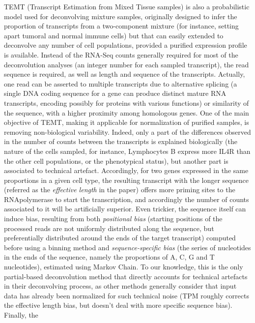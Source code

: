 TEMT (Transcript Estimation from Mixed Tissue samples)
\autocite{li_xie13} is also a
probabilistic model used for deconvolving mixture samples, originally
designed to infer the proportion of transcripts from a two-component
mixture (for instance, setting apart tumoral and normal immune cells)
but that can easily extended to deconvolve any number of cell
populations, provided a purified expression profile is available.
Instead of the \acrshort{RNA-Seq} counts generally required for most of the
deconvolution analyses (an integer number for each sampled transcript),
the read sequence is required, as well as length and sequence of the
transcripts. Actually, one read can be asserted to multiple transcripts
due to alternative splicing (a single DNA coding sequence for a gene can
produce distinct mature RNA transcripts, encoding possibly for proteins
with various functions) or similarity of the sequence, with a higher
proximity among homologous genes. One of the main objective of TEMT,
making it applicable for normalization of purified samples, is removing
non-biological variability. Indeed, only a part of the differences
observed in the number of counts between the transcripts is explained
biologically (the nature of the cells sampled, for instance, Lymphocytes
B express more IL4R than the other cell populations, or the phenotypical
status), but another part is associated to technical artefact.
Accordingly, for two genes expressed in the same proportions in a given
cell type, the resulting transcript with the longer sequence (referred
as the \emph{effective length} in the paper) offers more priming sites
to the RNApolymerase to start the transcription, and accordingly the
number of counts associated to it will be artificially superior. Even
trickier, the sequence itself can induce bias, resulting from both
\emph{positional bias} (starting positions of the processed reads are
not uniformly distributed along the sequence, but preferentially
distributed around the ends of the target transcript) computed before
using a binning method and \emph{sequence-specific bias} (the series of
nucleotides in the ends of the sequence, namely the proportions of A, C,
G and T nucleotides), estimated using Markov Chain. To our knowledge,
this is the only partial-based deconvolution method that directly
accounts for technical artefacts in their deconvolving process, as other
methods generally consider that input data has already been normalized
for such technical noise (TPM roughly corrects the effective length
bias, but doesn't deal with more specific sequence bias). Finally, the
